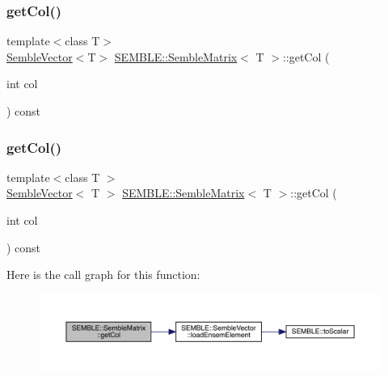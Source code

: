 \mbox{\label{structSEMBLE_1_1SembleMatrix_ac90d6f868b9a3731eadb99891c078149}} 
\subsubsection{\texorpdfstring{getCol()}{getCol()}\hspace{0.1cm}{\footnotesize\ttfamily [1/2]}}
{\footnotesize\ttfamily template$<$class T$>$ \\
\mbox{\hyperlink{structSEMBLE_1_1SembleVector}{Semble\+Vector}}$<$T$>$ \mbox{\hyperlink{structSEMBLE_1_1SembleMatrix}{S\+E\+M\+B\+L\+E\+::\+Semble\+Matrix}}$<$ T $>$\+::get\+Col (\begin{DoxyParamCaption}\item[{int}]{col }\end{DoxyParamCaption}) const}

\mbox{\label{structSEMBLE_1_1SembleMatrix_afaaa55df8ea1fc3e27b2100d5cc70d78}} 
\subsubsection{\texorpdfstring{getCol()}{getCol()}\hspace{0.1cm}{\footnotesize\ttfamily [2/2]}}
{\footnotesize\ttfamily template$<$class T $>$ \\
\mbox{\hyperlink{structSEMBLE_1_1SembleVector}{Semble\+Vector}}$<$ T $>$ \mbox{\hyperlink{structSEMBLE_1_1SembleMatrix}{S\+E\+M\+B\+L\+E\+::\+Semble\+Matrix}}$<$ T $>$\+::get\+Col (\begin{DoxyParamCaption}\item[{int}]{col }\end{DoxyParamCaption}) const}

Here is the call graph for this function\+:
\nopagebreak
\begin{figure}[H]
\begin{center}
\leavevmode
\includegraphics[width=350pt]{df/d87/structSEMBLE_1_1SembleMatrix_afaaa55df8ea1fc3e27b2100d5cc70d78_cgraph}
\end{center}
\end{figure}
\mbox{\label{structSEMBLE_1_1SembleMatrix_a31078e328f597a99646b6f12caa01418}} 
